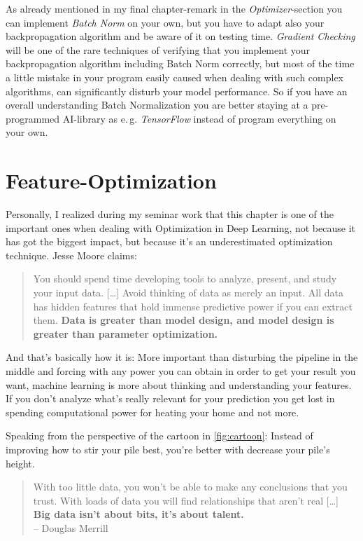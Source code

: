 \documentclass[dvipsnames,twocolumn]{scrartcl}
\begin{document}
	As already mentioned in my final chapter-remark in the \emph{Optimizer}-section you can implement \emph{Batch Norm} on your own, but you have to adapt also your backpropagation algorithm and be aware of it on testing time. \emph{Gradient Checking} will be one of the rare techniques of verifying that you implement your backpropagation algorithm including Batch Norm correctly, but most of the time a little mistake in your program easily caused when dealing with such complex algorithms, can significantly disturb your model performance. So if you have an overall understanding Batch Normalization you are better staying at a pre-programmed AI-library as e.\,g. \emph{TensorFlow} instead of program everything on your own.
	
	
	\section{Feature-Optimization}
	
	Personally, I realized during my seminar work that this chapter is one of the important ones when dealing with Optimization in Deep Learning, not because it has got the biggest impact, but because it's an underestimated optimization technique. Jesse Moore claims:
	\blockquote{You should spend time developing tools to analyze, present, and study your input data. [\dots] Avoid thinking of data as merely an input. All data has hidden features that hold immense predictive power if you can extract them. \textbf{Data is greater than model design, and model design is greater than parameter optimization.}}
	
	And that's basically how it is: More important than disturbing the pipeline in the middle and forcing with any power you can obtain in order to get your result you want, machine learning is more about thinking and understanding your features. If you don't analyze what's really relevant for your prediction you get lost in spending computational power for heating your home and not more.
	
	Speaking from the perspective of the cartoon in \autoref{fig:cartoon}: Instead of improving how to stir your pile best, you're better with decrease your pile's height.
	
	\blockquote{With too little data, you won’t be able to make any conclusions that you trust. With loads of data you will find relationships that aren’t real [\dots] \textbf{Big data isn’t about bits, it’s about talent.} \\-- Douglas Merrill}
	
\end{document}
